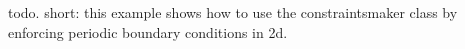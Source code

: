 todo. short: this example shows how to use the constraintsmaker class by enforcing periodic boundary conditions in 2d.
